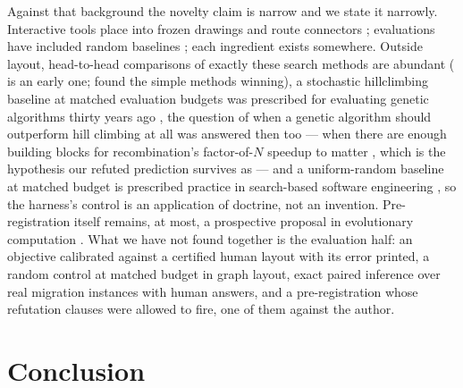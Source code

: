 \documentclass[11pt]{article}
\begin{document}
Against that background the novelty claim is narrow and we state it narrowly. Interactive
tools place into frozen drawings and route connectors \cite{pt98,dunnart}; evaluations
have included random baselines \cite{cms95}; each ingredient exists somewhere. Outside
layout, head-to-head comparisons of exactly these search methods are abundant
(\cite{talbi93} is an early one; \cite{baluja95} found the simple methods winning), a
stochastic hillclimbing baseline at matched evaluation budgets was prescribed for
evaluating genetic algorithms thirty years ago \cite{jw95}, the question of when a genetic
algorithm should outperform hill climbing at all was answered then too --- when there are
enough building blocks for recombination's factor-of-$N$ speedup to matter \cite{mhf93},
which is the hypothesis our refuted prediction survives as --- and a
uniform-random baseline at matched budget is prescribed practice in search-based software
engineering \cite{arcuri14}, so the harness's control is an application of doctrine, not an
invention. Pre-registration itself remains, at most, a prospective proposal in
evolutionary computation \cite{lbp21}. What we
have not found together is the evaluation half: an objective calibrated against a
certified human layout with its error printed, a random control at matched budget in graph
layout, exact paired inference over real migration instances with human answers, and a
pre-registration whose refutation clauses were allowed to fire, one of them against the
author.

\section{Conclusion}
\end{document}
